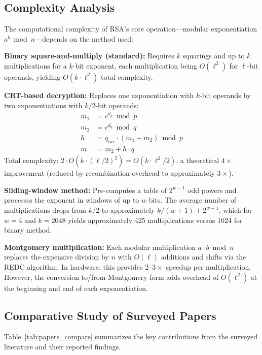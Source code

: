 \documentclass[journal]{IEEEtran}
\begin{document}
\subsection{Complexity Analysis}

The computational complexity of RSA's core operation---modular exponentiation $a^b \bmod n$---depends on the method used:

\textbf{Binary square-and-multiply (standard):}
Requires $k$ squarings and up to $k$ multiplications for a $k$-bit exponent, each multiplication being $O(\ell^2)$ for $\ell$-bit operands, yielding $O(k \cdot \ell^2)$ total complexity.

\textbf{CRT-based decryption:}
Replaces one exponentiation with $k$-bit operands by two exponentiations with $k/2$-bit operands:
\begin{align}
    m_1 &= c^{d_p} \bmod p \label{eq:crt1} \\
    m_2 &= c^{d_q} \bmod q \label{eq:crt2} \\
    h &= q_{\mathrm{inv}} \cdot (m_1 - m_2) \bmod p \label{eq:crt3} \\
    m &= m_2 + h \cdot q \label{eq:crt4}
\end{align}
Total complexity: $2 \cdot O(k \cdot (\ell/2)^2) = O(k \cdot \ell^2 / 2)$, a theoretical $4\times$ improvement (reduced by recombination overhead to approximately $3\times$).

\textbf{Sliding-window method:}
Pre-computes a table of $2^{w-1}$ odd powers and processes the exponent in windows of up to $w$ bits. The average number of multiplications drops from $k/2$ to approximately $k/(w+1) + 2^{w-1}$, which for $w=4$ and $k=2048$ yields approximately 425 multiplications versus 1024 for binary method.

\textbf{Montgomery multiplication:}
Each modular multiplication $a \cdot b \bmod n$ replaces the expensive division by $n$ with $O(\ell)$ additions and shifts via the REDC algorithm. In hardware, this provides $2$--$3\times$ speedup per multiplication. However, the conversion to/from Montgomery form adds overhead of $O(\ell^2)$ at the beginning and end of each exponentiation.

\subsection{Comparative Study of Surveyed Papers}

Table~\ref{tab:papers_compare} summarizes the key contributions from the surveyed literature and their reported findings.
\end{document}
